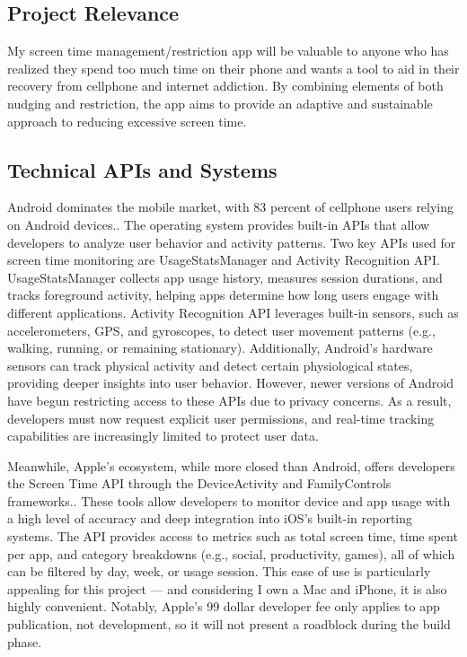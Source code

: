 \documentclass[10pt,twocolumn]{article}
\begin{document}
\subsection{Project Relevance}
My screen time management/restriction app will be valuable to anyone who has realized they spend too much time on their phone and wants a tool to aid in their recovery from cellphone and internet addiction. By combining elements of both nudging and restriction, the app aims to provide an adaptive and sustainable approach to reducing excessive screen time.

\subsection{Technical APIs and Systems}
Android dominates the mobile market, with 83 percent of cellphone users relying on Android devices.\cite{AndroidAPI}.  The operating system provides built-in APIs that allow developers to analyze user behavior and activity patterns. Two key APIs used for screen time monitoring are UsageStatsManager and Activity Recognition API.
UsageStatsManager collects app usage history, measures session durations, and tracks foreground activity, helping apps determine how long users engage with different applications.
Activity Recognition API leverages built-in sensors, such as accelerometers, GPS, and gyroscopes, to detect user movement patterns (e.g., walking, running, or remaining stationary).\cite{ScreenTimeInsomnia}
Additionally, Android's hardware sensors can track physical activity and detect certain physiological states, providing deeper insights into user behavior.
However, newer versions of Android have begun restricting access to these APIs due to privacy concerns. As a result, developers must now request explicit user permissions, and real-time tracking capabilities are increasingly limited to protect user data.

Meanwhile, Apple’s ecosystem, while more closed than Android, offers developers the Screen Time API through the DeviceActivity and FamilyControls frameworks.\cite{AppleAPI}.  These tools allow developers to monitor device and app usage with a high level of accuracy and deep integration into iOS’s built-in reporting systems. The API provides access to metrics such as total screen time, time spent per app, and category breakdowns (e.g., social, productivity, games), all of which can be filtered by day, week, or usage session. \cite{AppleAPI}This ease of use is particularly appealing for this project — and considering I own a Mac and iPhone, it is also highly convenient. Notably, Apple’s 99 dollar developer fee only applies to app publication, not development, so it will not present a roadblock during the build phase.
\end{document}
